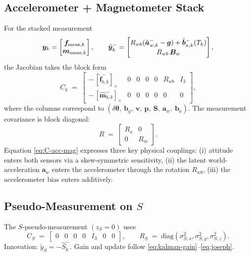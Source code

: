 \documentclass[10pt]{extarticle}
\begin{document}
\subsection{Accelerometer + Magnetometer Stack}
For the stacked measurement
\[
\bm y_k = 
\begin{bmatrix}
\bm f_{{\rm meas},k}\\ \bm m_{{\rm meas},k}
\end{bmatrix},\qquad
\hat{\bm y}_k^- =
\begin{bmatrix}
R_{wb}(\hat{\bm a}_{w,k}^- - \bm g) + \hat{\bm b}_{a,k}^-(T_k)\\[2pt]
R_{wb}\,\bm B_w
\end{bmatrix},
\]
the Jacobian takes the block form
\begin{equation}
C_k \;=\;
\begin{bmatrix}
-\,[\hat{\bm f}_{b,k}^-]_\times & 0 & 0 & 0 & 0 & R_{wb} & I_3\\[2pt]
-\,[\hat{\bm m}_{b,k}^-]_\times & 0 & 0 & 0 & 0 & 0 & 0
\end{bmatrix},
\label{eq:C-acc-mag}
\end{equation}
where the columns correspond to $(\delta\bm\theta,\ \bm b_g,\ \bm v,\ \bm p,\ \bm S,\ \bm a_w,\ \bm b_a)$.
The measurement covariance is block diagonal:
\begin{equation}
R \;=\; 
\begin{bmatrix}
R_a & 0\\ 0 & R_m
\end{bmatrix}.
\label{eq:R-acc-mag}
\end{equation}
Equation \eqref{eq:C-acc-mag} expresses three key physical couplings:
(i) attitude enters both sensors via a skew-symmetric sensitivity,
(ii) the latent world-acceleration \(\bm a_w\) enters the accelerometer through the rotation \(R_{wb}\),
(iii) the accelerometer bias enters additively.

\subsection{Pseudo-Measurement on $S$}
The $S$-pseudo-measurement \((z_S=0)\) uses
\begin{equation}
C_{S} \;=\; \begin{bmatrix} 0 & 0 & 0 & 0 & I_3 & 0 & 0 \end{bmatrix},\qquad
R_S \;=\; \mathrm{diag}(\sigma_{S,x}^2,\sigma_{S,y}^2,\sigma_{S,z}^2).
\label{eq:C-R-S}
\end{equation}
Innovation: $\tilde y_S = - \hat S_k^-$. Gain and update follow \eqref{eq:kalman-gain}--\eqref{eq:joseph}.
\end{document}
